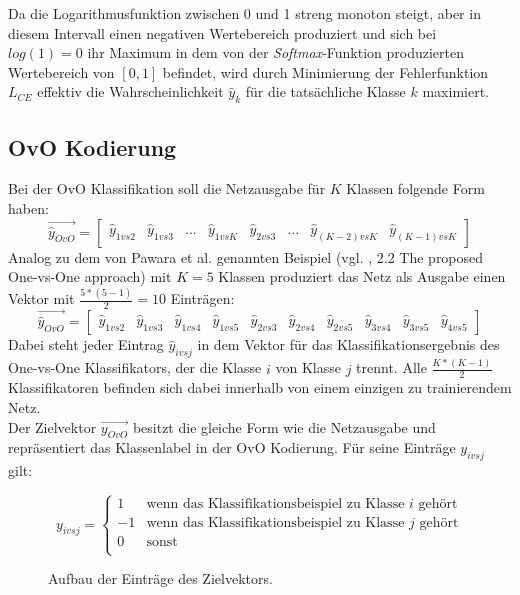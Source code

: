 Da die Logarithmusfunktion zwischen 0 und 1 streng monoton steigt, aber in diesem Intervall einen negativen Wertebereich produziert und sich bei\\ $log(1)=0$ ihr Maximum in dem von der \textit{Softmax}-Funktion produzierten Wertebereich von $[0, 1]$ befindet, wird durch Minimierung der Fehlerfunktion $L_{CE}$ effektiv die Wahrscheinlichkeit $\widehat{y}_k$ für die tatsächliche Klasse $k$ maximiert.


\subsection{OvO Kodierung}
Bei der OvO Klassifikation soll die Netzausgabe für $K$ Klassen folgende Form haben:
\[\overrightarrow{\widehat{y}_{OvO}} = \begin{bmatrix}
\widehat{y}_{1vs2} & \widehat{y}_{1vs3} & ... & \widehat{y}_{1vsK} & \widehat{y}_{2vs3} &... & \widehat{y}_{(K-2)vs K} & \widehat{y}_{(K-1)vsK}
\end{bmatrix} \]
Analog zu dem von Pawara et al. genannten Beispiel (vgl. \cite{pawaraPaper}, 2.2 The proposed One-vs-One approach) mit $K=5$ Klassen produziert das Netz als Ausgabe einen Vektor mit $\frac{5*(5-1)}{2}=10$ Einträgen:
\[\overrightarrow{\widehat{y}_{OvO}} = \begin{bmatrix}
\widehat{y}_{1vs2} & \widehat{y}_{1vs3} & \widehat{y}_{1vs4} & \widehat{y}_{1vs5} & \widehat{y}_{2vs3} & \widehat{y}_{2vs4} & \widehat{y}_{2vs5} & \widehat{y}_{3vs4} & \widehat{y}_{3vs5} & \widehat{y}_{4vs5}
\end{bmatrix} \]
Dabei steht jeder Eintrag $\widehat{y}_{ivsj}$ in dem Vektor für das Klassifikationsergebnis des One-vs-One Klassifikators, der die Klasse $i$ von Klasse $j$ trennt. Alle $\frac{K*(K-1)}{2}$ Klassifikatoren befinden sich dabei innerhalb von einem einzigen zu trainierendem Netz.\\
Der Zielvektor $\overrightarrow{y_{OvO}}$ besitzt die gleiche Form wie die Netzausgabe und repräsentiert das Klassenlabel in der OvO Kodierung. Für seine Einträge $y_{ivsj}$ gilt:
\begin{figure}[H]
\[
y_{ivsj} = 
\begin{cases}
1 & \text{wenn das Klassifikationsbeispiel zu Klasse } i \text{ gehört}\\
-1 & \text{wenn das Klassifikationsbeispiel zu Klasse } j \text{ gehört}\\
0 & \text{sonst}\\
\end{cases}
\]
\caption{Aufbau der Einträge des Zielvektors.}
\label{gl:OvOZielvektor}
\end{figure}
